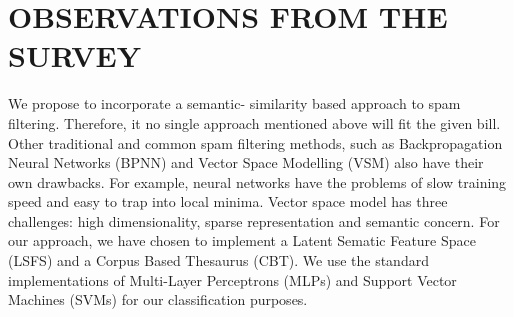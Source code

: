 \section{OBSERVATIONS FROM THE SURVEY}

We propose to incorporate a semantic- similarity based approach to spam filtering. Therefore, it no single approach mentioned above will fit the given bill.  Other traditional and common spam filtering methods, such as Backpropagation Neural Networks (BPNN) and Vector Space Modelling (VSM) also have their own drawbacks. For example, neural networks have the problems of slow training speed and easy to trap into local minima. Vector space model has three challenges: high dimensionality, sparse representation and semantic concern. For our approach, we have chosen to implement a Latent Sematic Feature Space (LSFS) and a Corpus Based Thesaurus (CBT). We use the standard implementations of Multi-Layer Perceptrons (MLPs) and Support Vector Machines (SVMs) for our classification purposes.



